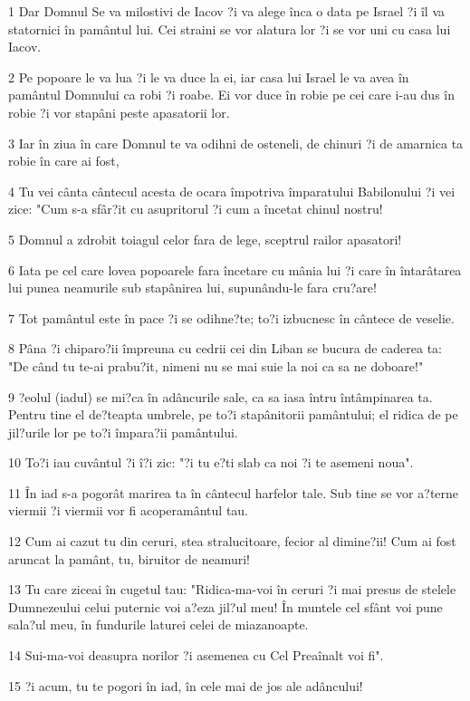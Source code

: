 \par 1 Dar Domnul Se va milostivi de Iacov ?i va alege înca o data pe Israel ?i îl va statornici în pamântul lui. Cei straini se vor alatura lor ?i se vor uni cu casa lui Iacov.
\par 2 Pe popoare le va lua ?i le va duce la ei, iar casa lui Israel le va avea în pamântul Domnului ca robi ?i roabe. Ei vor duce în robie pe cei care i-au dus în robie ?i vor stapâni peste apasatorii lor.
\par 3 Iar în ziua în care Domnul te va odihni de osteneli, de chinuri ?i de amarnica ta robie în care ai fost,
\par 4 Tu vei cânta cântecul acesta de ocara împotriva împaratului Babilonului ?i vei zice: "Cum s-a sfâr?it cu asupritorul ?i cum a încetat chinul nostru!
\par 5 Domnul a zdrobit toiagul celor fara de lege, sceptrul railor apasatori!
\par 6 Iata pe cel care lovea popoarele fara încetare cu mânia lui ?i care în întarâtarea lui punea neamurile sub stapânirea lui, supunându-le fara cru?are!
\par 7 Tot pamântul este în pace ?i se odihne?te; to?i izbucnesc în cântece de veselie.
\par 8 Pâna ?i chiparo?ii împreuna cu cedrii cei din Liban se bucura de caderea ta: "De când tu te-ai prabu?it, nimeni nu se mai suie la noi ca sa ne doboare!"
\par 9 ?eolul (iadul) se mi?ca în adâncurile sale, ca sa iasa întru întâmpinarea ta. Pentru tine el de?teapta umbrele, pe to?i stapânitorii pamântului; el ridica de pe jil?urile lor pe to?i împara?ii pamântului.
\par 10 To?i iau cuvântul ?i î?i zic: "?i tu e?ti slab ca noi ?i te asemeni noua".
\par 11 În iad s-a pogorât marirea ta în cântecul harfelor tale. Sub tine se vor a?terne viermii ?i viermii vor fi acoperamântul tau.
\par 12 Cum ai cazut tu din ceruri, stea stralucitoare, fecior al dimine?ii! Cum ai fost aruncat la pamânt, tu, biruitor de neamuri!
\par 13 Tu care ziceai în cugetul tau: "Ridica-ma-voi în ceruri ?i mai presus de stelele Dumnezeului celui puternic voi a?eza jil?ul meu! În muntele cel sfânt voi pune sala?ul meu, în fundurile laturei celei de miazanoapte.
\par 14 Sui-ma-voi deasupra norilor ?i asemenea cu Cel Preaînalt voi fi".
\par 15 ?i acum, tu te pogori în iad, în cele mai de jos ale adâncului!
